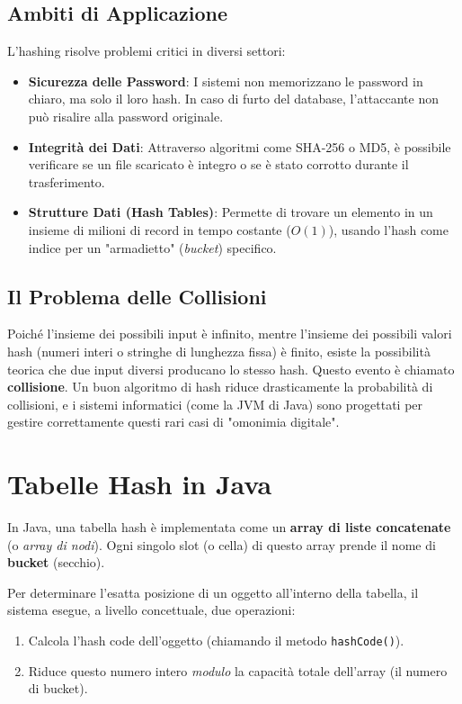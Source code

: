 \subsection*{Ambiti di Applicazione}
L'hashing risolve problemi critici in diversi settori:
\begin{itemize}
    \item \textbf{Sicurezza delle Password}: I sistemi non memorizzano le password in chiaro, ma solo il loro hash. In caso di furto del database, l'attaccante non può risalire alla password originale.
    \item \textbf{Integrità dei Dati}: Attraverso algoritmi come SHA-256 o MD5, è possibile verificare se un file scaricato è integro o se è stato corrotto durante il trasferimento.
    \item \textbf{Strutture Dati (Hash Tables)}: Permette di trovare un elemento in un insieme di milioni di record in tempo costante ($O(1)$), usando l'hash come indice per un "armadietto" (\textit{bucket}) specifico.
\end{itemize}

\subsection*{Il Problema delle Collisioni}
Poiché l'insieme dei possibili input è infinito, mentre l'insieme dei possibili valori hash (numeri interi o stringhe di lunghezza fissa) è finito, esiste la possibilità teorica che due input diversi producano lo stesso hash. Questo evento è chiamato \textbf{collisione}.
Un buon algoritmo di hash riduce drasticamente la probabilità di collisioni, e i sistemi informatici (come la JVM di Java) sono progettati per gestire correttamente questi rari casi di "omonimia digitale".

\section{Tabelle Hash in Java}
\label{hashTables}
In Java, una tabella hash è implementata come un \textbf{array di liste concatenate} (o \textit{array di nodi}). Ogni singolo slot (o cella) di questo array prende il nome di \textbf{bucket} (secchio).

Per determinare l'esatta posizione di un oggetto all'interno della tabella, il sistema esegue, a livello concettuale, due operazioni:
\begin{enumerate}
    \item Calcola l'hash code dell'oggetto (chiamando il metodo \texttt{hashCode()}).
    \item Riduce questo numero intero \textit{modulo} la capacità totale dell'array (il numero di bucket).
\end{enumerate}

